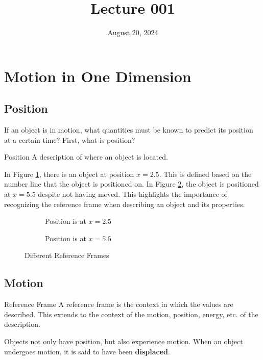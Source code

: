\documentclass[12pt, letterpaper]{article}
\title{Lecture 001}
\date{August 20, 2024}
\begin{document}
\section{Motion in One Dimension}

\subsection{Position}

If an object is in motion, what quantities must be known to predict its position at a
certain time? First, what is position?

\begin{definition}{Position}
  A description of where an object is located.
\end{definition}

In Figure \ref{fig:001}, there is an object at position $x=2.5$. This is defined based on
the number line that the object is positioned on. In Figure \ref{fig:002}, the object is
positioned at $x=5.5$ despite not having moved. This highlights the importance of recognizing
the reference frame when describing an object and its properties.

\begin{figure}[H]
  \centering
  \begin{subfigure}[H]{0.45\textwidth}
    \centering
    
    \caption{Position is at $x=2.5$}
    \label{fig:001}
  \end{subfigure}
  \begin{subfigure}[H]{0.45\textwidth}
    \centering
    
    \caption{Position is at $x=5.5$}
    \label{fig:002}
  \end{subfigure}
  \caption{Different Reference Frames}
  \label{fig:refFrame}
\end{figure}
\vspace{-25pt}

\subsection{Motion}

\begin{definition}{Reference Frame}
  A reference frame is the context in which the values are described. This extends to the
  context of the motion, position, energy, etc. of the description.
\end{definition}

Objects not only have position, but also experience motion. When an object undergoes motion,
it is said to have been \textbf{displaced}.
\end{document}

